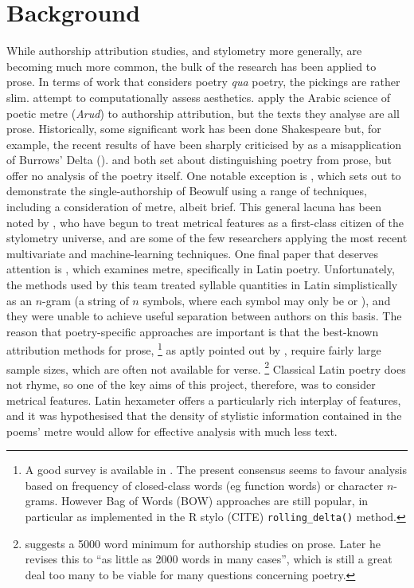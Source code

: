 \documentclass[11pt,a4paper]{scrartcl} %
\begin{document}
\section{Background}
While authorship attribution studies, and stylometry more generally, are becoming much more common, the bulk of the research has been applied to prose. In terms of work that considers poetry \textit{qua} poetry, the pickings are rather slim. \cite{kao_computational_2012} attempt to computationally assess aesthetics. \cite{omer_arud_2017} apply the Arabic science of poetic metre (\textit{Arud}) to authorship attribution, but the texts they analyse are all prose. Historically, some significant work has been done Shakespeare but, for example, the recent results of \cite{ilsemann_christopher_2018} have been sharply criticised by \cite{barber_marlowe_2019} as a misapplication of Burrows' Delta (\cite{burrows_delta:_2002}). \cite{tizhoosh_poetic_2008} and \cite{chaudhuri_small_nodate} both set about distinguishing poetry from prose, but offer no analysis of the poetry itself. One notable exception is \cite{neidorf_large-scale_2019}, which sets out to demonstrate the single-authorship of Beowulf using a range of techniques, including a consideration of metre, albeit brief. This general lacuna has been noted by \cite{plechac_versification_2019}, who have begun to treat metrical features as a first-class citizen of the stylometry universe, and are some of the few researchers applying the most recent multivariate and machine-learning techniques. One final paper that deserves attention is \cite{forstall_evidence_2011}, which examines metre, specifically in Latin poetry. Unfortunately, the methods used by this team treated syllable quantities in Latin simplistically as an $n$-gram (a string of $n$ symbols, where each symbol may only be  or \metricsymbols{_}), and they were unable to achieve useful separation between authors on this basis. The reason that poetry-specific approaches are important is that the best-known attribution methods for prose,%
%
\footnote{A good survey is available in \cite{jockers_comparative_2010}. The present consensus seems to favour analysis based on frequency of closed-class words (eg function words) or character $n$-grams. However Bag of Words (BOW) approaches are still popular, in particular as implemented in the R stylo (CITE) \texttt{rolling\_delta()} method.}
as aptly pointed out by \cite{eder_does_2015}, require fairly large sample sizes, which are often not available for verse.%
%
\footnote{\cite{eder_does_2015} suggests a 5000 word minimum for authorship studies on prose. Later \cite[4]{eder_short_2017} he revises this to ``as little as 2000 words in many cases'', which is still a great deal too many to be viable for many questions concerning poetry.}
%
Classical Latin poetry does not rhyme, so one of the key aims of this project, therefore, was to consider metrical features. Latin hexameter offers a particularly rich interplay of features, and it was hypothesised that the density of stylistic information contained in the poems' metre would allow for effective analysis with much less text.
\end{document}

